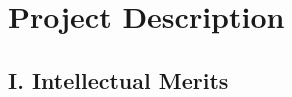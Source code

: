 \documentclass[11pt,letterpaper]{article}
\begin{document}
\newpage
\section*{Project Description}

\subsection*{I. Intellectual Merits}

\end{document}
